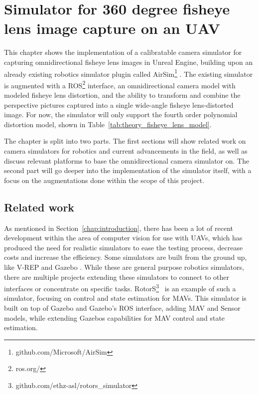 
\chapter{Simulator for 360 degree fisheye lens image capture on an UAV} \label{chap:simulator}

This chapter shows the implementation of a calibratable camera simulator for capturing omnidirectional fisheye lens images in Unreal Engine, building upon an already existing robotics simulator plugin called AirSim\footnote{github.com/Microsoft/AirSim} \cite{Airsim_paper}. The existing simulator is augmented with a ROS\footnote{ros.org/} interface, an omnidirectional camera model with modeled fisheye lens distortion, and the ability to transform and combine the perspective pictures captured into a single wide-angle fisheye lens-distorted image. For now, the simulator will only support the fourth order polynomial distortion model, shown in Table~\ref{tab:theory_fisheye_lens_model}.

The chapter is split into two parts. The first sections will show related work on camera simulators for robotics and current advancements in the field, as well as discuss relevant platforms to base the omnidirectional camera simulator on. The second part will go deeper into the implementation of the simulator itself, with a focus on the augmentations done within the scope of this project.

\section{Related work} \label{sec:simulator_related}

As mentioned in Section~\ref{chap:introduction}, there has been a lot of recent development within the area of computer vision for use with UAVs, which has produced the need for realistic simulators to ease the testing process, decrease costs and increase the efficiency. Some simulators are built from the ground up, like V-REP \cite{VREP2013} and Gazebo \cite{GazeboPaper}. While these are general purpose robotics simulators, there are multiple projects extending these simulators to connect to other interfaces or concentrate on specific tasks. RotorS\footnote{github.com/ethz-asl/rotors\_simulator}~\cite{RotorS} is an example of such a simulator, focusing on control and state estimation for MAVs. This simulator is built on top of Gazebo and Gazebo's ROS interface, adding MAV and Sensor models, while extending Gazebos capabilities for MAV control and state estimation.

